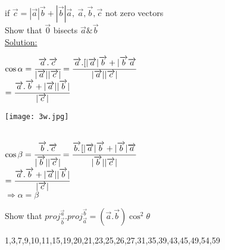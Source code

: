 \begin{example}
if $\overrightarrow{c}=|\overrightarrow{a}|\overrightarrow{b}+|\overrightarrow{b}|\overrightarrow{a},~\overrightarrow{a},\overrightarrow{b},\overrightarrow{c}$ not zero 
vectors\\
Show that $\overrightarrow{0}$ bisects $\overrightarrow{a}\&\overrightarrow{b}$\\
{\color{smalt(darkpowderblue)}\underline{Solution:}} \\
\noindent\begin{minipage}{0.7\textwidth}
$\cos{\alpha}=\cfrac{\overrightarrow{a}.\overrightarrow{c}}{|\overrightarrow{a}||\overrightarrow{c}|}=\cfrac{\overrightarrow{a}.[|\overrightarrow{a}|\overrightarrow{b}+|
\overrightarrow{b}\overrightarrow{a}}{|\overrightarrow{a}||\overrightarrow{c}|}$\\
$=\cfrac{\overrightarrow{a}.\overrightarrow{b}+|\overrightarrow{a}||\overrightarrow{b}|}{|\overrightarrow{c}|}$\\
\end{minipage}
\noindent\begin{minipage}{0.3\textwidth}
\texttt{[image: 3w.jpg]}
\end{minipage}\\
$\cos\beta=\cfrac{\overrightarrow{b}.\overrightarrow{c}}{|\overrightarrow{b}||\overrightarrow{c}|}=\cfrac{\overrightarrow{b.}[|\overrightarrow{a}|\overrightarrow{b}+|
\overrightarrow{b}|\overrightarrow{a}}{|\overrightarrow{b}||\overrightarrow{c}|}$\\
$=\cfrac{\overrightarrow{a}.\overrightarrow{b}+|\overrightarrow{a}||\overrightarrow{b}|}{|\overrightarrow{c}|}$\\
$\Rightarrow\alpha=\beta$
\end{example}
\begin{exercise}
Show that $proj_{\overrightarrow{b}}^{\overrightarrow{a}}.proj_{\overrightarrow{a}}^{\overrightarrow{b}}=(\overrightarrow{a}.\overrightarrow{b})\cos^2\theta$
\end{exercise}
\noindent{\color{smalt(darkpowderblue)}\rule{\linewidth}{.2mm}}
\begin{problem}
1,3,7,9,10,11,15,19,20,21,23,25,26,27,31,35,39,43,45,49,54,59
\end{problem}
